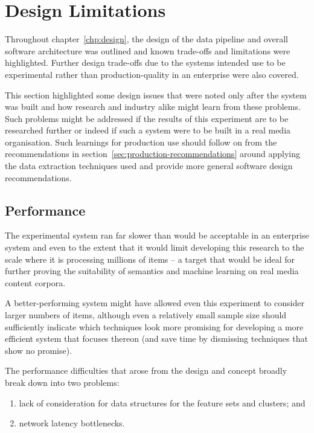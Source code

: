 \section{Design Limitations}

Throughout chapter~\ref{chp:design}, the design of the data pipeline
and overall software architecture was outlined and known trade-offs
and limitations were highlighted. Further design trade-offs due to
the systems intended use to be experimental rather than
production-quality in an enterprise were also covered.

This section highlighted some design issues that were noted only after
the system was built and how research and industry alike might learn
from these problems. Such problems might be addressed if the results
of this experiment are to be researched further or indeed if such
a system were to be built in a real media organisation. Such
learnings for production use should follow on from the
recommendations in section~\ref{sec:production-recommendations} around
applying the data extraction techniques used and provide more general
software design recommendations.

\subsection{Performance}
\label{sec:eval-perf}

The experimental system ran far slower than would be acceptable in
an enterprise system and even to the extent that it would limit
developing this research to the scale where it is processing millions
of items -- a target that would be ideal for further proving the
suitability of semantics and machine learning on real media
content corpora.

A better-performing system might have allowed even this experiment
to consider larger numbers of items, although even a relatively
small sample size should sufficiently indicate which techniques look
more promising for developing a more efficient system that focuses
thereon (and save time by dismissing techniques that show no promise).

The performance difficulties that arose from the design and concept
broadly break down into two problems:

\begin{enumerate}
\item lack of consideration for data structures for the feature sets
  and clusters; and
\item network latency bottlenecks.
\end{enumerate}

